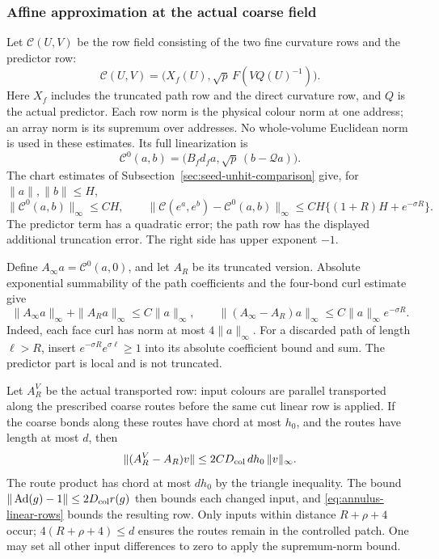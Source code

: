 \subsubsection{Affine approximation at the actual coarse field}
Let $\mathcal C(U,V)$ be the row field consisting of the two fine
curvature rows and the predictor row:
\[
 \mathcal C(U,V)=\bigl(X_f(U),\sqrt p\,F(VQ(U)^{-1})\bigr).
\]
Here $X_f$ includes the truncated path row and the direct curvature
row, and $Q$ is the actual predictor. Each row norm is the physical
colour norm at one address; an array norm is its supremum over
addresses. No whole-volume Euclidean norm is used in these estimates. Its full linearization is
\[
 \mathcal C^0(a,b)
   =\bigl(B_fd_fa,\sqrt p\,(b-\mathcal Qa)\bigr).
\]
The chart estimates of Subsection~\ref{sec:seed-unhit-comparison}
give, for $\|a\|,\|b\|\le H$,
\begin{equation}\label{eq:annulus-origin-error}
 \|\mathcal C^0(a,b)\|_\infty\le C H,\qquad
 \|\mathcal C(e^a,e^b)-\mathcal C^0(a,b)\|_\infty
 \le C H\{(1+R)H+e^{-\sigma R}\}.
\end{equation}
The predictor term has a quadratic error; the path row has the
displayed additional truncation error. The right side has upper
exponent $-1$.

Define $A_\infty a=\mathcal C^0(a,0)$, and let $A_R$ be its
truncated version. Absolute exponential summability of the path
coefficients and the four-bond curl estimate give
\begin{equation}\label{eq:annulus-linear-rows}
 \|A_\infty a\|_\infty+\|A_Ra\|_\infty\le C\|a\|_\infty,
 \qquad
 \|(A_\infty-A_R)a\|_\infty
 \le C\|a\|_\infty e^{-\sigma R}.
\end{equation}
Indeed, each face curl has norm at most $4\|a\|_\infty$.
For a discarded path of length $\ell>R$, insert
$e^{-\sigma R}e^{\sigma\ell}\ge1$ into its absolute coefficient
bound and sum. The predictor part is local and is not truncated.

Let $A_R^V$ be the actual transported row: input colours are
parallel transported along the prescribed coarse routes before the
same cut linear row is applied. If the coarse bonds along these
routes have chord at most $h_0$, and the routes have length at most
$d$, then
\begin{equation}\label{eq:annulus-transport-error}
 \|(A_R^V-A_R)v\|\le
 2C D_{\rm col}\,d h_0\,\|v\|_\infty.
\end{equation}
The route product has chord at most $dh_0$ by the triangle
inequality. The bound
$\|\operatorname{Ad}(g)-1\|\le2D_{\rm col}r(g)$ then bounds
each changed input, and \eqref{eq:annulus-linear-rows} bounds the
resulting row. Only inputs within distance $R+\rho+4$ occur;
$4(R+\rho+4)\le d$ ensures the routes remain in the controlled
patch. One may set all other input differences to zero to apply
the supremum-norm bound.

